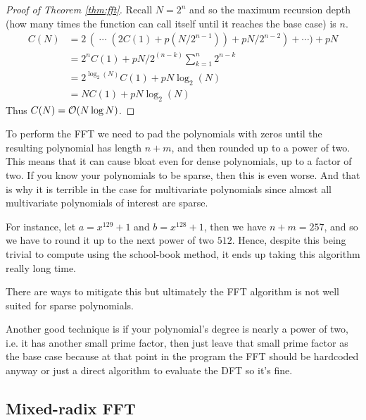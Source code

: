 

\begin{proof}[Proof of Theorem \ref{thm:fft}]
    Recall $N = 2^n$ and so the maximum recursion depth (how many times the function can call itself until it reaches the base case) is $n$.
    \begin{align*}
    C(N) &= 2\,(\;\cdots\; (2C(1) + p(N/2^{n-1})) + pN/2^{n-2}) + \cdots ) + pN\\
         &= 2^{n}C(1) + pN/2^{(n-k)}\sum^n_{k=1} 2^{n-k}\\
         &= 2^{\log_2(N)}C(1) + pN\log_2(N)\\
         &= NC(1) + pN\log_2(N)
    \end{align*}
    Thus $C(N) = \mathcal O(N \log N)$.
\end{proof}

\begin{remark}
    To perform the FFT we need to pad the polynomials with zeros until the resulting polynomial has length $n + m$, and then rounded up to a power of two. This means that it can cause bloat even for dense polynomials, up to a factor of two. If you know your polynomials to be sparse, then this is even worse. And that is why it is terrible in the case for multivariate polynomials since almost all multivariate polynomials of interest are sparse.

    For instance, let $a = x^{129} + 1$ and $b = x^{128} + 1$, then we have $n + m = 257$, and so we have to round it up to the next power of two $512$. Hence, despite this being trivial to compute using the school-book method, it ends up taking this algorithm really long time.

    There are ways to mitigate this but ultimately the FFT algorithm is not well suited for sparse polynomials.

    Another good technique is if your polynomial's degree is nearly a power of two, i.e. it has another small prime factor, then just leave that small prime factor as the base case because at that point in the program the FFT should be hardcoded anyway or just a direct algorithm to evaluate the DFT so it's fine.

\end{remark}

\subsection{Mixed-radix FFT}

